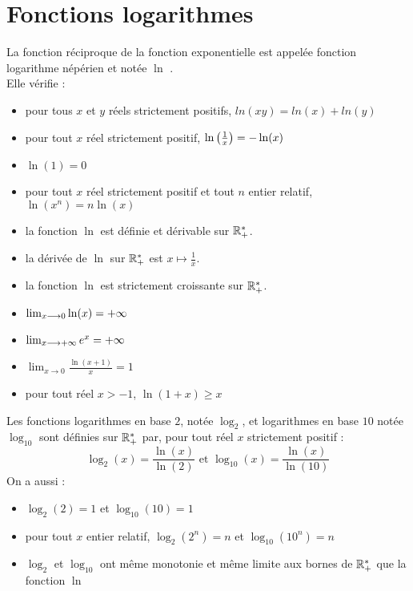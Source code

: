\section{Fonctions logarithmes}
\begin{defprop}
    La fonction réciproque de la fonction exponentielle est appelée fonction logarithme népérien et notée \(\ln\) . \\
Elle vérifie : \begin{itemize}
    \item  pour tous \(x\) et \(y\) réels strictement positifs, \(ln(xy) = ln(x) + ln(y)\) 
    \item pour tout \(x\) réel strictement positif, \(\ln\left(\frac{1}{x}\right) = -\ln(x) \)
    \item \(\ln(1) = 0\)
    \item pour tout \(x\) réel strictement positif et tout \(n\) entier relatif, \(\ln(x^n) = n\ln(x)\)
    \item la fonction \(\ln\) est définie et dérivable sur \(\mathbb{R}_+^*\).
	\item la dérivée de \(\ln\) sur \(\mathbb{R}_+^*\) est \(x\mapsto\frac{1}{x}\).
	\item la fonction \(\ln\) est strictement croissante sur \(\mathbb{R}_+^*\).
	\item \(\lim_{x\longrightarrow 0}\ln(x) =+\infty\)
	\item \(\lim_{x\longrightarrow+\infty} e^x = +\infty \)
	\item \(\lim_{x\to 0} \frac{\ln(x+1)}{x} = 1\)
	\item pour tout réel \(x>-1\), \(\ln(1+x)\geq x\)
\end{itemize}
\end{defprop}

\begin{defprop}
    Les fonctions logarithmes en base \(2\), notée \(\log_2\), et logarithmes en base \(10\) notée \(\log_{10}\) sont définies sur \(\mathbb{R}_+^*\) par, pour tout réel \(x\) strictement positif : 
    \[\log_2(x) = \frac{\ln(x)}{\ln(2)}\text{ et }\log_{10}(x) =\frac{\ln(x)}{\ln(10)} \]
    On a aussi : \begin{itemize}
        \item \(\log_2(2) = 1\) et \(\log_{10}(10) = 1\)
        \item pour tout \(x\) entier relatif, \(\log_2(2^n) = n \) et \(\log_{10}(10^n) =n\)
        \item \(\log_2\) et \(\log_{10}\) ont même monotonie et même limite aux bornes de \(\mathbb{R}_+^*\) que la fonction \(\ln\)
    \end{itemize}
\end{defprop}

